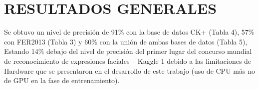 \chapter*{RESULTADOS GENERALES}
Se obtuvo un nivel de precisión de 91\% con la base de datos CK+ (Tabla 4), 57\%
con FER2013 (Tabla 3) y 60\% con la unión de ambas bases de datos (Tabla 5), Estando
14\% debajo del nivel de precisión del primer lugar del concurso mundial de
reconocimiento de expresiones faciales – Kaggle 1 debido a las limitaciones de Hardware
que se presentaron en el desarrollo de este trabajo (uso de CPU más no de GPU en la fase
de entrenamiento).